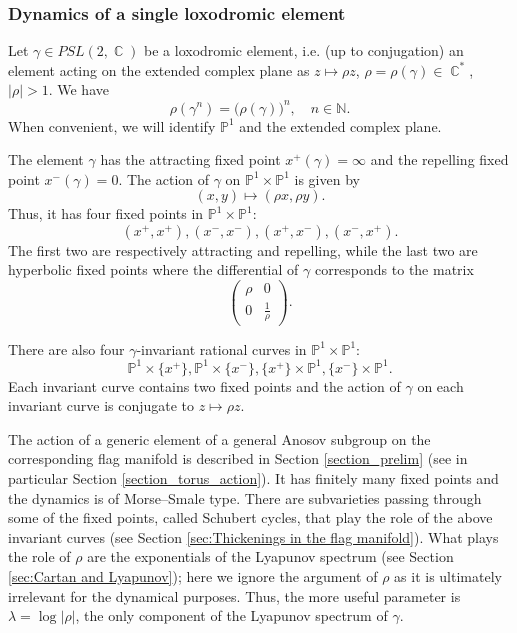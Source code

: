 \documentclass[12pt]{amsbook}%
\theoremstyle{definition}
\theoremstyle{remark}
\numberwithin{section}{chapter}
\numberwithin{subsection}{section}
\numberwithin{figure}{chapter}
\DeclareMathOperator{\C}{\mathbb{C}}
\def\P{{\mathbb{P}}}
\def\bP{{\mathbb{P}}}
\def\bN{{\mathbb{N}}}
\def\ga{\gamma}
\def\la{\lambda}
\begin{document}
{{\subsubsection{Dynamics of a single loxodromic element}

Let $\gamma\in PSL(2,\C)$ be a loxodromic element, i.e. (up to conjugation) an element acting on the extended complex plane as 
$z\mapsto \rho z$, 
$\rho=\rho(\ga)\in \C^*$, $|\rho|>1$. We have 
\[\rho(\ga^n)=\big(\rho(\ga)\big)^n,\quad n\in \bN.\]
When convenient, we will identify $\P^1$ and the extended complex plane. 

The element $\gamma$ has the attracting fixed point $x^+(\ga)=\infty$ and the repelling fixed point $x^-(\ga)=0$. The action of $\ga$ on $\bP^1\times \bP^1$ is given by 
\[(x,y)\mapsto (\rho x,\rho y).\]
Thus, it has  four fixed points in $\bP^1\times \bP^1$:
\[(x^+,x^+), (x^-,x^-), (x^+,x^-), (x^-,x^+).\]
The first two are respectively attracting and repelling, while the last two are hyperbolic fixed points where the differential of $\ga$ corresponds to the matrix 
\[\begin{pmatrix}
\rho&0\\0&\frac{1}{\rho}
\end{pmatrix}.\]


There are also four $\gamma$-invariant rational curves in $\bP^1\times \bP^1$:
\[ \bP^1\times \{x^+\}, \bP^1\times \{x^-\},\{x^+\}\times \bP^1, \{x^-\}\times \bP^1.\]
Each invariant curve contains two fixed points and the action of $\gamma$ on each invariant curve is conjugate to $z\mapsto \rho z$. 


The action of a generic element of a general Anosov subgroup on the corresponding flag manifold is described in Section \ref{section_prelim} (see in particular Section \ref{section_torus_action}). It has finitely many fixed points and  the dynamics is of Morse--Smale type. There are subvarieties passing through some of the fixed points, called Schubert cycles, that play the role of the above invariant curves (see Section \ref{sec:Thickenings in the flag manifold}). What plays the role of $\rho$ are the exponentials of the Lyapunov spectrum (see Section \ref{sec:Cartan and Lyapunov}); here we ignore the argument of $\rho$ as it is ultimately irrelevant for the dynamical purposes. Thus, the more useful parameter 
is $\la=\log |\rho|$,  the only component of the Lyapunov spectrum of $\ga$. 

}}
\end{document}
